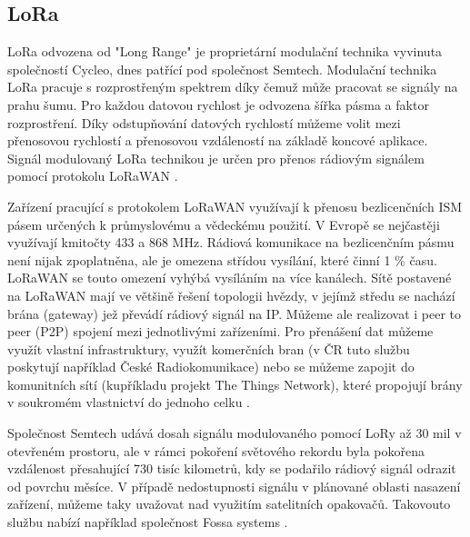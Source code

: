 \subsection{\acs{LoRa}}
\par LoRa odvozena od "Long Range" je proprietární modulační technika vyvinuta společností Cycleo, dnes patřící pod společnost Semtech. Modulační technika \acs{LoRa} pracuje s rozprostřeným spektrem díky čemuž může pracovat se signály na prahu šumu. Pro každou datovou rychlost je odvozena šířka pásma a faktor rozprostření. Díky odstupňování datových rychlostí můžeme volit mezi přenosovou rychlostí a přenosovou vzdáleností na základě koncové aplikace. Signál modulovaný \acs{LoRa} technikou je určen pro přenos rádiovým signálem pomocí protokolu \acs{LoRaWAN} \cite{B5fEKVY7u8J8dyUq, Pech2019}.
\par Zařízení pracující s protokolem \acs{LoRaWAN} využívají k přenosu bezlicenčních \acs{ISM} pásem určených k průmyslovému a vědeckému použití. V Evropě se nejčastěji využívají kmitočty 433 a 868 MHz. Rádiová komunikace na bezlicenčním pásmu není nijak zpoplatněna, ale je omezena střídou vysílání, které činní 1 \% času. \acs{LoRaWAN} se touto omezení vyhýbá vysíláním na více kanálech. Sítě postavené na \acs{LoRaWAN} mají ve většině řešení topologii hvězdy, v jejímž středu se nachází brána (gateway) jež převádí rádiový signál na IP. Můžeme ale realizovat i peer to peer (P2P) spojení mezi jednotlivými zařízeními. Pro přenášení dat můžeme využít vlastní infrastruktury, využít komerčních bran (v ČR tuto službu poskytují například České Radiokomunikace) nebo se můžeme zapojit do komunitních sítí (kupříkladu projekt The Things Network), které propojují brány v soukromém vlastnictví do jednoho celku \cite{B5fEKVY7u8J8dyUq, Pech2019}. 
\par Společnost Semtech udává dosah signálu modulovaného pomocí LoRy až 30 mil v otevřeném prostoru, ale v rámci pokoření světového rekordu byla pokořena vzdálenost přesahující 730 tisíc kilometrů, kdy se podařilo rádiový signál odrazit od povrchu měsíce. V případě nedostupnosti signálu v plánované oblasti nasazení zařízení, můžeme taky uvažovat nad využitím satelitních opakovačů. Takovouto službu nabízí například společnost Fossa systems \cite{b2bXQAhEG5l7OcrW, jP0mkWtryNxDkAWP}. 

